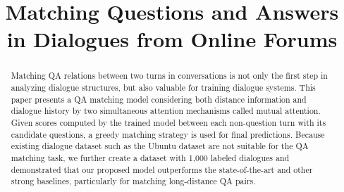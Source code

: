 \documentclass[letterpaper]{article} %
\title{Matching Questions and Answers in Dialogues from Online Forums}
\newcommand{\KZ}[1]{\textcolor{red}{Kenny: #1}}
\begin{document}
\maketitle

\begin{abstract}


Matching QA relations between two turns in conversations is not only 
the first step in analyzing dialogue structures, 
but also valuable for training dialogue systems. 
This paper presents a QA matching model considering both 
distance information and dialogue history by two simultaneous attention 
mechanisms called mutual attention. 
Given scores computed by the trained model between each non-question 
turn with its candidate questions, a greedy matching strategy 
is used for final predictions. %
Because existing dialogue dataset such as the Ubuntu dataset are not 
suitable for the QA matching task, we further create a dataset with 
1,000 labeled dialogues and 
demonstrated that our proposed model outperforms the state-of-the-art and 
other strong baselines, particularly for
matching long-distance QA pairs.
\end{abstract}






















\end{document}
